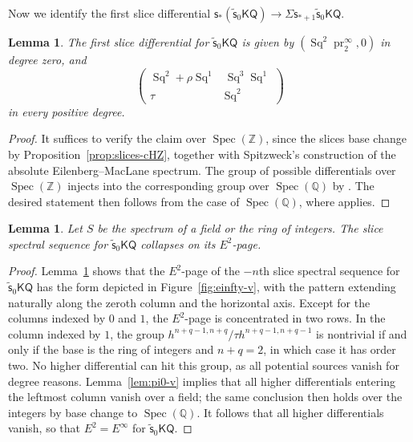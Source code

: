 \documentclass[11pt,hyp,english]{article}
\newcommand{\Z}{\mathbb{Z}}
\newcommand{\Q}{\mathbb{Q}}
\newcommand{\KQ}{\mathsf{KQ}}
\newcommand{\Spec}{\operatorname{Spec}}
\newcommand{\Sq}{\operatorname{Sq}}
\newcommand{\pr}{\operatorname{pr}}
\newcommand{\s}{\mathsf{s}}
\newcommand{\vs}{\tilde{\mathsf{s}}}
\newtheorem{lemma}[theorem]{Lemma}
\theoremstyle{definition}
\begin{document}
Now we identify the first slice differential 
$\s_\ast(\vs_{0}\KQ )\to \Sigma \s_{\ast+1}\vs_{0}\KQ $.

\begin{lemma}
\label{lem:d1-v}
The first slice differential for $\vs_{0}\KQ $ is given by $(\Sq^2\pr^\infty_2,0)$ in degree zero, 
and
\[\begin{pmatrix} 
\Sq^2+\rho\Sq^1 & \Sq^3\Sq^1\\ \tau & \Sq^2
\end{pmatrix} \] in every positive degree.
\end{lemma}

\begin{proof}
It suffices to verify the claim over $\Spec(\Z)$, since the slices base change by Proposition~\ref{prop:slices-cHZ}, together with Spitzweck’s construction of the absolute Eilenberg–MacLane spectrum. The group of possible differentials over $\Spec(\Z)$ injects into the corresponding group over $\Spec(\Q)$ by . The desired statement then follows from the case of $\Spec(\Q)$, where \cite[Lemma 4.1]{zbMATH07003144} applies.
\end{proof}

\begin{lemma}
\label{lemma:sssforV}
Let $S$ be the spectrum of a field or the ring of integers.
The slice spectral sequence for $\vs_{0}\KQ $ collapses on its $E^{2}$-page.
\end{lemma}
\begin{proof}
Lemma~\ref{lem:d1-v} shows that the $E^2$-page of the $-n$th slice spectral sequence for $\vs_{0}\KQ$ has the form depicted in Figure~\ref{fig:einfty-v}, with the pattern extending naturally along the zeroth column and the horizontal axis. Except for the columns indexed by $0$ and $1$, the $E^2$-page is concentrated in two rows. In the column indexed by $1$, the group $h^{n+q-1,n+q}/\tau h^{n+q-1,n+q-1}$ 
is nontrivial if and only if the base is the ring of integers and $n+q=2$, in which case it has order two. No higher differential can hit this group, as all potential sources vanish for degree reasons. Lemma~\ref{lem:pi0-v} implies that all higher differentials entering the leftmost column vanish over a field; the same conclusion then holds over the integers by base change to $\Spec(\Q)$. It follows that all higher differentials vanish, so that $E^2=E^\infty$ for $\vs_{0}\KQ$.
\end{proof}
\end{document}
